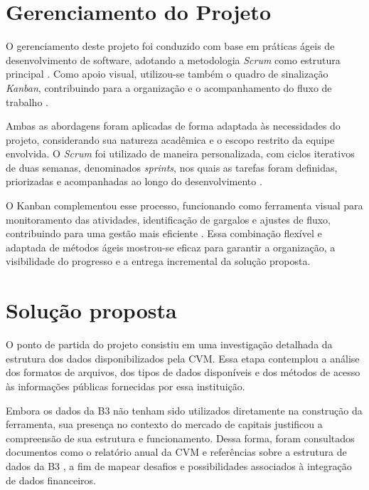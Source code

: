 \section{Gerenciamento do Projeto} \label{subsec:metodologia}

O gerenciamento deste projeto foi conduzido com base em práticas ágeis de desenvolvimento de software, adotando a metodologia \textit{Scrum} como estrutura principal \cite{schwaber:2004:agile}. Como apoio visual, utilizou-se também o quadro de sinalização \textit{Kanban}, contribuindo para a organização e o acompanhamento do fluxo de trabalho \cite{anderson:2010:kanban}.

Ambas as abordagens foram aplicadas de forma adaptada às necessidades do projeto, considerando sua natureza acadêmica e o escopo restrito da equipe envolvida. O \textit{Scrum} foi utilizado de maneira personalizada, com ciclos iterativos de duas semanas, denominados \textit{sprints}, nos quais as tarefas foram definidas, priorizadas e acompanhadas ao longo do desenvolvimento \cite{sutherland:2014:scrum}.

O Kanban complementou esse processo, funcionando como ferramenta visual para monitoramento das atividades, identificação de gargalos e ajustes de fluxo, contribuindo para uma gestão mais eficiente \cite{hammarberg:2014:kanban}. Essa combinação flexível e adaptada de métodos ágeis mostrou-se eficaz para garantir a organização, a visibilidade do progresso e a entrega incremental da solução proposta.



\section{Solução proposta}  \label{subsec:solucao}

O ponto de partida do projeto consistiu em uma investigação detalhada da estrutura dos dados disponibilizados pela CVM. Essa etapa contemplou a análise dos formatos de arquivos, dos tipos de dados disponíveis e dos métodos de acesso às informações públicas fornecidas por essa instituição.

Embora os dados da B3 não tenham sido utilizados diretamente na construção da ferramenta, sua presença no contexto do mercado de capitais justificou a compreensão de sua estrutura e funcionamento. Dessa forma, foram consultados documentos como o relatório anual da CVM \cite{cvm:2023:relatorioanual} e referências sobre a estrutura de dados da B3 \cite{b3:2023:estruturadados}, a fim de mapear desafios e possibilidades associados à integração de dados financeiros.

